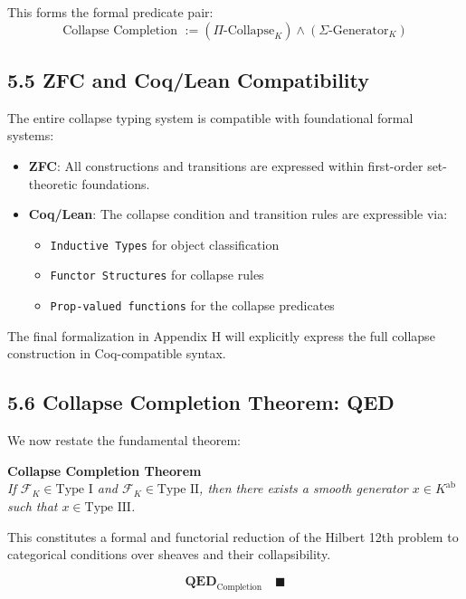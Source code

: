\documentclass[11pt]{article}
\begin{document}
This forms the formal predicate pair:
\[
\text{Collapse Completion } := (\Pi\text{-Collapse}_K) \wedge (\Sigma\text{-Generator}_K)
\]

\subsection{5.5 ZFC and Coq/Lean Compatibility}

The entire collapse typing system is compatible with foundational formal systems:

\begin{itemize}
    \item \textbf{ZFC}: All constructions and transitions are expressed within first-order set-theoretic foundations.
    \item \textbf{Coq/Lean}: The collapse condition and transition rules are expressible via:
        \begin{itemize}
            \item \texttt{Inductive Types} for object classification
            \item \texttt{Functor Structures} for collapse rules
            \item \texttt{Prop-valued functions} for the collapse predicates
        \end{itemize}
\end{itemize}

The final formalization in Appendix H will explicitly express the full collapse construction in Coq-compatible syntax.

\subsection{5.6 Collapse Completion Theorem: QED}

We now restate the fundamental theorem:

\begin{center}
\textbf{Collapse Completion Theorem}  
\\[0.5em]
\textit{
If \( \mathcal{F}_K \in \text{Type I} \) and \( \mathcal{F}_K \in \text{Type II} \), then there exists a smooth generator \( x \in K^{\mathrm{ab}} \) such that \( x \in \text{Type III} \).
}
\end{center}

This constitutes a formal and functorial reduction of the Hilbert 12th problem to categorical conditions over sheaves and their collapsibility.

\[
\textbf{QED}_{\mathrm{Completion}} \quad \blacksquare
\]
\end{document}
